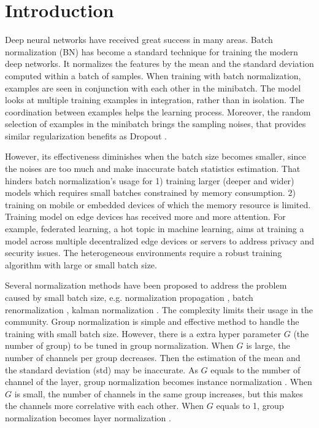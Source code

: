 \documentclass[runningheads]{llncs}
\begin{document}
\section{Introduction}

Deep neural networks have received great success in many areas. Batch normalization (BN) has become a standard technique for training the modern deep networks. 
It normalizes the features by the mean and the standard deviation computed within a batch of samples. 
When training with batch normalization, examples are seen in conjunction with each other in the minibatch. The model looks at multiple training examples in integration, rather than in isolation. The coordination between examples helps the learning process. Moreover, the random selection of examples in the minibatch brings the sampling noises, that provides similar regularization benefits as Dropout \cite{srivastava2014dropout}.


However, its effectiveness diminishes when the batch size becomes smaller, since the noises are too much and make inaccurate batch statistics estimation. That hinders batch normalization’s usage for 
1) training larger (deeper and wider) models which requires small batches constrained by memory consumption. 
2) training on mobile or embedded devices of which the memory resource is limited.
Training model on edge devices has received more and more attention. For example, 
federated learning, a hot topic in machine learning,  aims at training a model across multiple decentralized edge devices or servers to address privacy and security issues. The heterogeneous environments require a robust training algorithm with large or small batch size.
 
Several normalization methods have been proposed to address the problem caused by small batch size, e.g. normalization propagation \cite{arpit2016normalization}, batch renormalization \cite{ioffe2017batch}, kalman normalization \cite{wang2018kalman}. The complexity limits their usage in the community. Group normalization \cite{wu2018group} is simple and effective method to handle the training with small batch size. However, there is a extra hyper parameter $G$ (the number of group) to be tuned in group normalization. When $G$ is large, the number of channels per group decreases. Then the estimation of the mean and the standard deviation (std) may be inaccurate. As $G$ equals to the number of channel of the layer, group normalization becomes instance normalization \cite{ulyanov2016instance}. When $G$ is small, the number of channels in the same group increases, but this makes the channels more correlative with each other. When $G$ equals to 1, group normalization becomes layer normalization \cite{ba2016layer}. 
\end{document}
